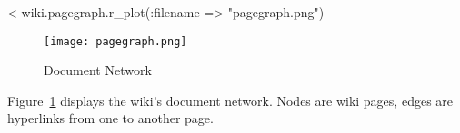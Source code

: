 \documentclass{scrartcl}
\begin{document}
<%
wiki.pagegraph.r_plot(:filename => "pagegraph.png")

\begin{figure}
	\centering
	\texttt{[image: pagegraph.png]}
	\caption{Document Network}
	\label{fig:document_network}
\end{figure}

Figure~\ref{fig:document_network} displays the wiki's document network. Nodes are wiki pages, edges are hyperlinks from one to another page. 




\end{document}
